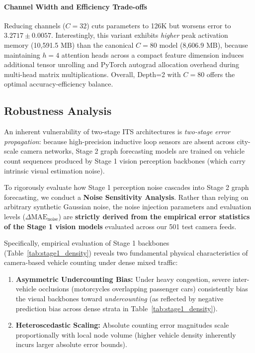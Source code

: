 \documentclass[preprint,12pt]{elsarticle}
\begin{document}
\paragraph{Channel Width and Efficiency Trade-offs} Reducing channels ($C=32$) cuts parameters to 126K but worsens error to $3.2717 \pm 0.0057$. Interestingly, this variant exhibits \emph{higher} peak activation memory (10,591.5 MB) than the canonical $C=80$ model (8,606.9 MB), because maintaining $h=4$ attention heads across a compact feature dimension induces additional tensor unrolling and PyTorch autograd allocation overhead during multi-head matrix multiplications. Overall, Depth=2 with $C=80$ offers the optimal accuracy-efficiency balance.

\subsection{Robustness Analysis}
\label{sec:noise_robustness}

An inherent vulnerability of two-stage ITS architectures is \emph{two-stage error propagation}: because high-precision inductive loop sensors are absent across city-scale camera networks, Stage 2 graph forecasting models are trained on vehicle count sequences produced by Stage 1 vision perception backbones (which carry intrinsic visual estimation noise).

To rigorously evaluate how Stage 1 perception noise cascades into Stage 2 graph forecasting, we conduct a \textbf{Noise Sensitivity Analysis}. Rather than relying on arbitrary synthetic Gaussian noise, the noise injection parameters and evaluation levels ($\Delta \text{MAE}_{\text{noise}}$) are \textbf{strictly derived from the empirical error statistics of the Stage 1 vision models} evaluated across our 501 test camera feeds.

Specifically, empirical evaluation of Stage 1 backbones (Table~\ref{tab:stage1_density}) reveals two fundamental physical characteristics of camera-based vehicle counting under dense mixed traffic:
\begin{enumerate}
    \item \textbf{Asymmetric Undercounting Bias:} Under heavy congestion, severe inter-vehicle occlusions (motorcycles overlapping passenger cars) consistently bias the visual backbones toward \emph{undercounting} (as reflected by negative prediction bias across dense strata in Table~\ref{tab:stage1_density}).
    \item \textbf{Heteroscedastic Scaling:} Absolute counting error magnitudes scale proportionally with local node volume (higher vehicle density inherently incurs larger absolute error bounds).
\end{enumerate}
\end{document}
